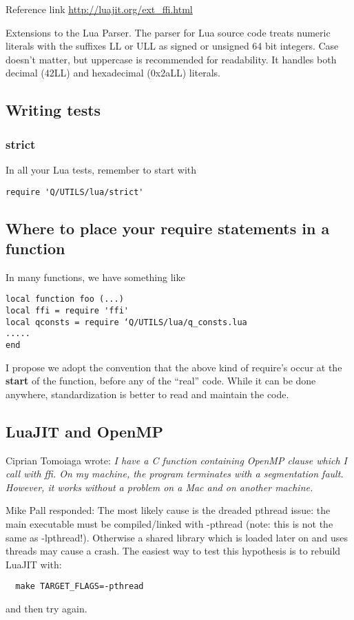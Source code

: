 Reference link \url{http://luajit.org/ext_ffi.html}

Extensions to the Lua Parser. 
The parser for Lua source code treats numeric literals with the suffixes LL
or ULL as signed or unsigned 64 bit integers. Case doesn't matter, but
uppercase is recommended for readability. It handles both decimal (42LL)
and hexadecimal (0x2aLL) literals.


\subsection{Writing tests}

\subsubsection{strict}

In all your Lua tests, remember to start with 
\begin{verbatim}
require 'Q/UTILS/lua/strict'
\end{verbatim}
\subsection{Where to place your require statements in a function}
In many functions, we have something like

\begin{verbatim}
local function foo (...)
local ffi = require 'ffi'
local qconsts = require ‘Q/UTILS/lua/q_consts.lua
.....
end
\end{verbatim}

I propose we adopt the convention that the above kind of require’s occur 
at the {\bf start} of the function, before any of the ``real'' code.  While it can be 
done anywhere, standardization is better to read and maintain the code.


\subsection{LuaJIT and OpenMP}

Ciprian Tomoiaga wrote:
{\it I have a C function containing OpenMP clause which I call with ffi. On my
machine, the program terminates with a segmentation fault. However, it
works without a problem on a Mac and on another machine. }

Mike Pall responded: 
The most likely cause is the dreaded pthread issue: the main
executable must be compiled/linked with -pthread (note: this is
not the same as -lpthread!). Otherwise a shared library which is
loaded later on and uses threads may cause a crash.
The easiest way to test this hypothesis is to rebuild LuaJIT with:
\begin{verbatim}
  make TARGET_FLAGS=-pthread
\end{verbatim}
and then try again.

